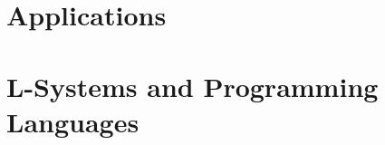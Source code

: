 \documentclass{acmtog}
\begin{document}
\section{Applications}
\label{sec:applications}


\section{L-Systems and Programming Languages}
\label{sec:languages}



\nocite{*}



\end{document}

